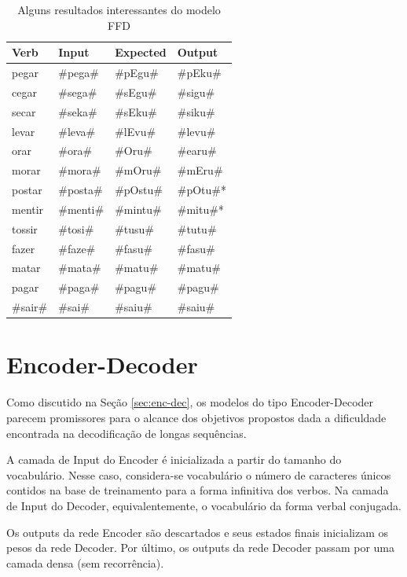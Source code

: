 \begin{table}[H]
\centering
\begin{tabular}{llll}
\textbf{Verb} & \textbf{Input} & \textbf{Expected} & \textbf{Output} \\ \hline
pegar & \#pega\# & \#pEgu\# & \#pEku\# \\
cegar & \#sega\# & \#sEgu\# & \#sigu\# \\
secar & \#seka\# & \#sEku\# & \#siku\# \\
levar & \#leva\# & \#lEvu\# & \#levu\# \\
orar & \#ora\# & \#Oru\# & \#earu\# \\
morar & \#mora\# & \#mOru\# & \#mEru\# \\
postar & \#posta\# & \#pOstu\# & \#pOtu\#* \\
mentir & \#menti\# & \#mintu\# & \#mitu\#* \\
tossir & \#tosi\# & \#tusu\# & \#tutu\# \\
fazer & \#faze\# & \#fasu\# & \#fasu\# \\
matar & \#mata\# & \#matu\# & \#matu\# \\
pagar & \#paga\# & \#pagu\# & \#pagu\# \\
\#sair\# & \#sai\# & \#saiu\# & \#saiu\#
\end{tabular}
\caption{Alguns resultados interessantes do modelo FFD}
\label{tab:res}
\end{table}

\section{Encoder-Decoder}
\label{sec:seq2seq}

Como discutido na Seção \ref{sec:enc-dec}, os modelos do tipo Encoder-Decoder parecem promissores para o alcance dos objetivos propostos dada a dificuldade encontrada na decodificação de longas sequências. %

A camada de Input do Encoder é inicializada a partir do tamanho do vocabulário. Nesse caso, considera-se vocabulário o número de caracteres únicos contidos na base de treinamento para a forma infinitiva dos verbos. Na camada de Input do Decoder, equivalentemente, o vocabulário da forma verbal conjugada.

Os outputs da rede Encoder são descartados e seus estados finais inicializam os pesos da rede Decoder. Por último, os outputs da rede Decoder passam por uma camada densa (sem recorrência).

